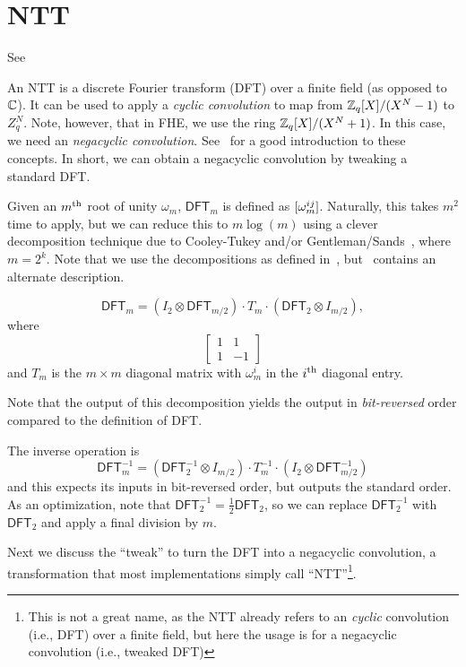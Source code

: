 \documentclass[../fheimpl.tex]{subfiles}
\begin{document}
\section{NTT}
See

An NTT is a discrete Fourier transform (DFT) over a finite field (as opposed to $\mathbb{C}$). It can be used to apply a \emph{cyclic convolution} to map from $\mathbb{Z}_q[X]/(X^N-1)$ to $Z_q^N$. Note, however, that in FHE, we use the ring $\mathbb{Z}_q[X]/(X^N+1)$. In this case, we need an \emph{negacyclic convolution}. See~\cite{cryptoeprint:2024/585} for a good introduction to these concepts. In short, we can obtain a negacyclic convolution by tweaking a standard DFT. 

Given an $m^{\mathrm{th}}$ root of unity $\omega_m$, $\mathsf{DFT}_m$ is defined as $[\omega_m^{ij}]$. Naturally, this takes $m^2$ time to apply, but we can reduce this to $m\log(m)$ using a clever decomposition technique due to Cooley-Tukey and/or Gentleman/Sands~\cite{cryptoeprint:2024/585}, where $m=2^k$. Note that we use the decompositions as defined in~\cite{cryptoeprint:2013/293}, but~\cite[C.2.5]{cryptoeprint:2015/1134} contains an alternate description.

\[\mathsf{DFT}_m = (I_2\otimes \mathsf{DFT}_{m/2})\cdot T_m\cdot (\mathsf{DFT}_2\otimes I_{m/2}),\]
where
\[
\begin{bmatrix}
    1 & 1 \\
    1 & -1
\end{bmatrix}
\]
and
$T_m$ is the $m\times m$ diagonal matrix with $\omega_m^i$ in the $i^{\mathrm{th}}$ diagonal entry.


Note that the output of this decomposition yields the output in \emph{bit-reversed} order compared to the definition of DFT.

The inverse operation is
\[\mathsf{DFT}_m^{-1} = (\mathsf{DFT}_2^{-1}\otimes I_{m/2})\cdot T_m^{-1}\cdot(I_2\otimes \mathsf{DFT}_{m/2}^{-1})\]
and this expects its inputs in bit-reversed order, but outputs the standard order.
As an optimization, note that $\mathsf{DFT}_2^{-1}=\frac{1}{2}\mathsf{DFT}_2$, so we can replace $\mathsf{DFT}_2^{-1}$ with $\mathsf{DFT}_2$ and apply a final division by $m$.

Next we discuss the ``tweak'' to turn the DFT into a negacyclic convolution, a transformation that most implementations simply call ``NTT''\footnote{This is not a great name, as the NTT already refers to an \emph{cyclic} convolution (i.e., DFT) over a finite field, but here the usage is for a negacyclic convolution (i.e., tweaked DFT)}. 
\end{document}
